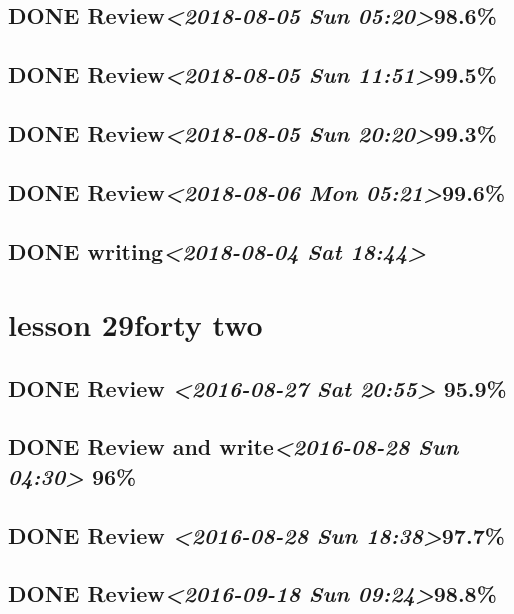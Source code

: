 \documentclass[11pt]{ctexart}
\begin{document}
\subsection{{\bfseries\sffamily DONE} Review\textit{<2018-08-05 Sun 05:20>}98.6\%}
\label{sec:orge1850de}
\subsection{{\bfseries\sffamily DONE} Review\textit{<2018-08-05 Sun 11:51>}99.5\%}
\label{sec:orgebcaccf}
\subsection{{\bfseries\sffamily DONE} Review\textit{<2018-08-05 Sun 20:20>}99.3\%}
\label{sec:org01a2772}
\subsection{{\bfseries\sffamily DONE} Review\textit{<2018-08-06 Mon 05:21>}99.6\%}
\label{sec:org676c692}
\subsection{{\bfseries\sffamily DONE} writing\textit{<2018-08-04 Sat 18:44>}}
\label{sec:org0cfc678}

\section{lesson 29forty two}
\label{sec:orgcfa67c0}
\subsection{{\bfseries\sffamily DONE} Review \textit{<2016-08-27 Sat 20:55> } 95.9\%}
\label{sec:org96f20bd}
\subsection{{\bfseries\sffamily DONE} Review and write\textit{<2016-08-28 Sun 04:30> } 96\%}
\label{sec:org3e61e94}
\subsection{{\bfseries\sffamily DONE} Review \textit{<2016-08-28 Sun 18:38>}97.7\%}
\label{sec:org26f7cea}
\subsection{{\bfseries\sffamily DONE} Review\textit{<2016-09-18 Sun 09:24>}98.8\%}
\label{sec:org68df5c0}
\end{document}

